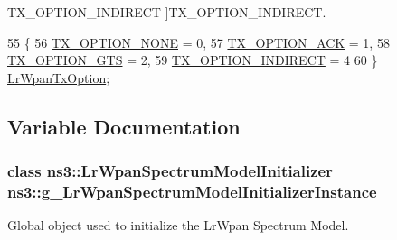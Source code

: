 \begin{Desc}
\begin{description}
{T\+X\+\_\+\+O\+P\+T\+I\+O\+N\+\_\+\+I\+N\+D\+I\+R\+E\+CT\hypertarget{group__lr-wpan_gga74ea891230ebf45d80d69a67266930a4a3f550efd3c932bcf500a567e30d6fa3e}{}\label{group__lr-wpan_gga74ea891230ebf45d80d69a67266930a4a3f550efd3c932bcf500a567e30d6fa3e}
}]T\+X\+\_\+\+O\+P\+T\+I\+O\+N\+\_\+\+I\+N\+D\+I\+R\+E\+CT. \end{description}
\end{Desc}

\begin{DoxyCode}
55 \{
56   \hyperlink{group__lr-wpan_gga74ea891230ebf45d80d69a67266930a4a873c8b896435efcdd1c058668efb88ea}{TX\_OPTION\_NONE} = 0,    
57   \hyperlink{group__lr-wpan_gga74ea891230ebf45d80d69a67266930a4a270a37d12b62bb8b5e92d646456244cf}{TX\_OPTION\_ACK} = 1,     
58   \hyperlink{group__lr-wpan_gga74ea891230ebf45d80d69a67266930a4a92b73ac4060ce7bc7ed5cf614cd48bfc}{TX\_OPTION\_GTS} = 2,     
59   \hyperlink{group__lr-wpan_gga74ea891230ebf45d80d69a67266930a4a3f550efd3c932bcf500a567e30d6fa3e}{TX\_OPTION\_INDIRECT} = 4 
60 \} \hyperlink{group__lr-wpan_ga74ea891230ebf45d80d69a67266930a4}{LrWpanTxOption};
\end{DoxyCode}


\subsection{Variable Documentation}
\subsubsection[{\texorpdfstring{g\+\_\+\+Lr\+Wpan\+Spectrum\+Model\+Initializer\+Instance}{g_LrWpanSpectrumModelInitializerInstance}}]{\setlength{\rightskip}{0pt plus 5cm}class {\bf ns3\+::\+Lr\+Wpan\+Spectrum\+Model\+Initializer}  ns3\+::g\+\_\+\+Lr\+Wpan\+Spectrum\+Model\+Initializer\+Instance}\hypertarget{group__lr-wpan_ga392425659812b34efb80b778be4f0ec9}{}\label{group__lr-wpan_ga392425659812b34efb80b778be4f0ec9}


Global object used to initialize the Lr\+Wpan Spectrum Model. 

